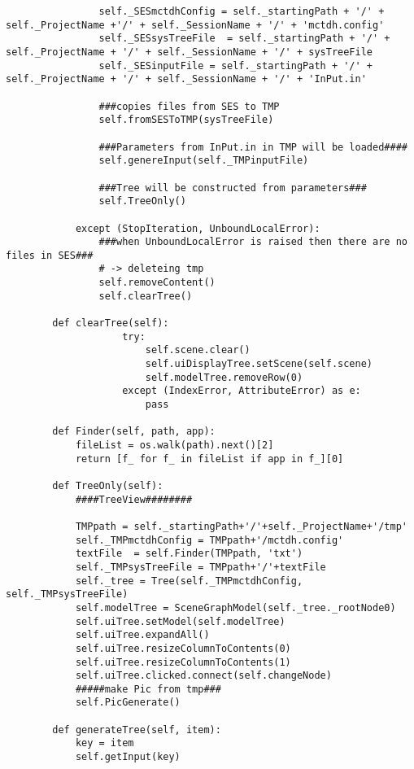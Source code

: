 \begin{verbatim}
                self._SESmctdhConfig = self._startingPath + '/' + self._ProjectName +'/' + self._SessionName + '/' + 'mctdh.config'
                self._SESsysTreeFile  = self._startingPath + '/' + self._ProjectName + '/' + self._SessionName + '/' + sysTreeFile
                self._SESinputFile = self._startingPath + '/' + self._ProjectName + '/' + self._SessionName + '/' + 'InPut.in'
    
                ###copies files from SES to TMP
                self.fromSESToTMP(sysTreeFile)
    
                ###Parameters from InPut.in in TMP will be loaded####
                self.genereInput(self._TMPinputFile)
    
                ###Tree will be constructed from parameters###
                self.TreeOnly()
    
            except (StopIteration, UnboundLocalError):
                ###when UnboundLocalError is raised then there are no files in SES###
                # -> deleteing tmp
                self.removeContent()
                self.clearTree()
        
        def clearTree(self):
                    try:
                        self.scene.clear()
                        self.uiDisplayTree.setScene(self.scene)
                        self.modelTree.removeRow(0)
                    except (IndexError, AttributeError) as e:
                        pass
    
        def Finder(self, path, app):
            fileList = os.walk(path).next()[2]
            return [f_ for f_ in fileList if app in f_][0]
    
        def TreeOnly(self):
            ####TreeView########
    
            TMPpath = self._startingPath+'/'+self._ProjectName+'/tmp'
            self._TMPmctdhConfig = TMPpath+'/mctdh.config'  
            textFile  = self.Finder(TMPpath, 'txt')
            self._TMPsysTreeFile = TMPpath+'/'+textFile 
            self._tree = Tree(self._TMPmctdhConfig, self._TMPsysTreeFile)
            self.modelTree = SceneGraphModel(self._tree._rootNode0)
            self.uiTree.setModel(self.modelTree)
            self.uiTree.expandAll()
            self.uiTree.resizeColumnToContents(0)
            self.uiTree.resizeColumnToContents(1)
            self.uiTree.clicked.connect(self.changeNode)
            #####make Pic from tmp###
            self.PicGenerate()
    
        def generateTree(self, item):
            key = item
            self.getInput(key)
            

\end{verbatim}
